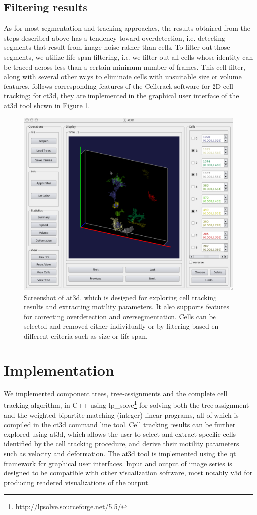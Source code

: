 \subsection{Filtering results}
As for most segmentation and tracking approaches, the results obtained from the steps described above has a tendency toward overdetection, i.e. detecting segments that result from image noise rather than cells. To filter out those segments, we utilize life span filtering, i.e. we filter out all cells whose identity can be traced across less than a certain minimum number of frames. This cell filter, along with several other ways to eliminate cells with unsuitable size or volume features, follows corresponding features of the Celltrack software \cite{sacan2008celltrack} for 2D cell tracking; for ct3d, they are implemented in the graphical user interface of the at3d tool shown in Figure \ref{fig:coseg-fig4}.

\begin{figure}[htbp]
\centering
\includegraphics[width=.5\textwidth]{images/coseg_fig4}
\caption[Screenshot of at3d]{Screenshot of at3d, which is designed for exploring cell tracking results and extracting motility parameters. It also supports features for correcting overdetection and oversegmentation. Cells can be selected and removed either individually or by filtering based on different criteria such as size or life span.}
\label{fig:coseg-fig4}
\end{figure}

\section{Implementation}
We implemented component trees, tree-assignments and the complete cell tracking algorithm, in C++ using lp\_solve\footnote{http://lpsolve.sourceforge.net/5.5/} for solving both the tree assignment and the weighted bipartite matching (integer) linear programs, all of which is compiled in the ct3d command line tool. Cell tracking results can be further explored using at3d, which allows the user to select and extract specific cells identified by the cell tracking procedure, and derive their motility parameters such as velocity and deformation. The at3d tool is implemented using the qt framework for graphical user interfaces. Input and output of image series is designed to be compatible with other visualization software, most notably v3d \cite{peng2010v3d} for producing rendered visualizations of the output.
